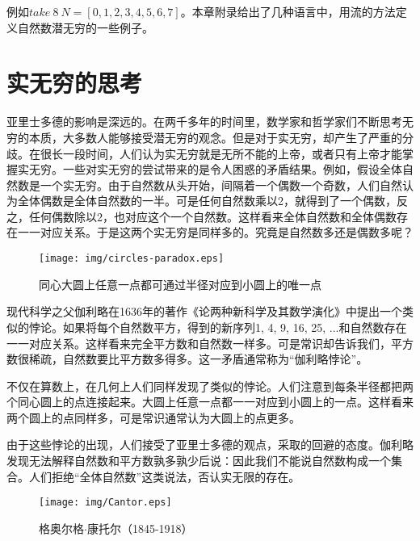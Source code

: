 \documentclass{article}
\begin{document}
例如$take\ 8\ N = [0, 1, 2, 3, 4, 5, 6, 7]$。本章附录给出了几种语言中，用流的方法定义自然数潜无穷的一些例子。

\begin{Exercise}
\end{Exercise}

\section{实无穷的思考}
亚里士多德的影响是深远的。在两千多年的时间里，数学家和哲学家们不断思考无穷的本质，大多数人能够接受潜无穷的观念。但是对于实无穷，却产生了严重的分歧。在很长一段时间，人们认为实无穷就是无所不能的上帝，或者只有上帝才能掌握实无穷。一些对实无穷的尝试带来的是令人困惑的矛盾结果。例如，假设全体自然数是一个实无穷。由于自然数从头开始，间隔着一个偶数一个奇数，人们自然认为全体偶数是全体自然数的一半。可是任何自然数乘以2，就得到了一个偶数，反之，任何偶数除以2，也对应这个一个自然数。这样看来全体自然数和全体偶数存在一一对应关系。于是这两个实无穷是同样多的。究竟是自然数多还是偶数多呢？

\begin{wrapfigure}{L}{0.4\textwidth}
 \centering
 \texttt{[image: img/circles-paradox.eps]}
 \caption{同心大圆上任意一点都可通过半径对应到小圆上的唯一点}
 \label{fig:circles-paradox}
\end{wrapfigure}

现代科学之父伽利略在1636年的著作《论两种新科学及其数学演化》中提出一个类似的悖论。如果将每个自然数平方，得到的新序列1, 4, 9, 16, 25, ...和自然数存在一一对应关系。这样看来完全平方数和自然数一样多。可是常识却告诉我们，平方数很稀疏，自然数要比平方数多得多。这一矛盾通常称为“伽利略悖论”。

不仅在算数上，在几何上人们同样发现了类似的悖论。人们注意到每条半径都把两个同心圆上的点连接起来。大圆上任意一点都一一对应到小圆上的一点。这样看来两个圆上的点同样多，可是常识通常认为大圆上的点更多。

由于这些悖论的出现，人们接受了亚里士多德的观点，采取的回避的态度。伽利略发现无法解释自然数和平方数孰多孰少后说：因此我们不能说自然数构成一个集合。人们拒绝“全体自然数”这类说法，否认实无限的存在。

\begin{wrapfigure}{R}{0.4\textwidth}
 \centering
 \texttt{[image: img/Cantor.eps]}
 \captionsetup{labelformat=empty}
 \caption{格奥尔格$\cdot$康托尔（1845-1918）}
 \label{fig:Cantor}
\end{wrapfigure}
\end{document}
